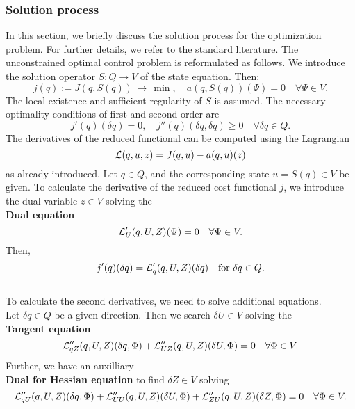 {\subsubsection{Solution process}
In this section, we briefly discuss the solution process for the 
optimization problem. For further details, we refer to the standard literature.
The unconstrained optimal control problem is reformulated as follows. 
We introduce the solution operator $S:Q\rightarrow V$ of the state equation.
Then:
\begin{equation*}
j(q):= J(q,S(q))\, \rightarrow \, \min , \quad a(q,S(q))(\Psi) = 0 \quad 
\forall \Psi \in V.
\end{equation*}
The local existence and sufficient regularity of $S$ is assumed. The 
necessary optimality conditions of first and second order are
\begin{equation*}
j'(q)(\delta q) = 0 , \quad j''(q)(\delta q,\delta q) \geq 0 \quad 
\forall\delta q\in Q.
\end{equation*} 
The derivatives of the reduced functional can be computed using the 
Lagrangian
\begin{equation*}
{\cal L}(q,u,z) =J(q,u) - a(q,u)(z)
\end{equation*}
as already introduced. Let $q\in Q$, and the corresponding state $u=S(q)\in V$ 
be given. To calculate the derivative of the reduced cost functional $j$, 
we introduce the dual variable
$z\in V$ solving the\\[3mm]
%
\textbf{Dual equation}\\
\begin{equation*}
{\cal L}_U'(q,U,Z)(\Psi) = 0 \quad\forall\Psi\in V.
\end{equation*}
Then,
\begin{equation*}
j'(q)(\delta q) = {\cal L}_q' (q,U,Z)(\delta q) \quad \text{for }\delta q\in Q.
\end{equation*}
\\[2mm]
%
To calculate the second derivatives, we need to solve additional equations.\\
%
Let $\delta q\in Q$ be a given direction. Then we search $\delta U\in V$  
solving the\\[2mm]
%
\textbf{Tangent equation}\\
%
\begin{equation*}
{\cal L}_{qZ}'' (q,U,Z)(\delta q,\Phi) + {\cal L}_{UZ}'' (q,U,Z)(\delta
U,\Phi) = 0
\quad\forall \Phi\in V.
\end{equation*}
Further, we have an auxilliary\\[2mm]  
%
\textbf{Dual for Hessian equation}
to find $\delta Z\in V$ solving
\begin{equation*}
{\cal L}_{qU}'' (q,U,Z)(\delta q,\Phi) + {\cal L}_{UU}'' 
(q,U,Z)(\delta U,\Phi) + {\cal L}_{ZU}'' (q,U,Z)(\delta Z,\Phi) =0 
\quad\forall \Phi\in V.
\end{equation*}

}
